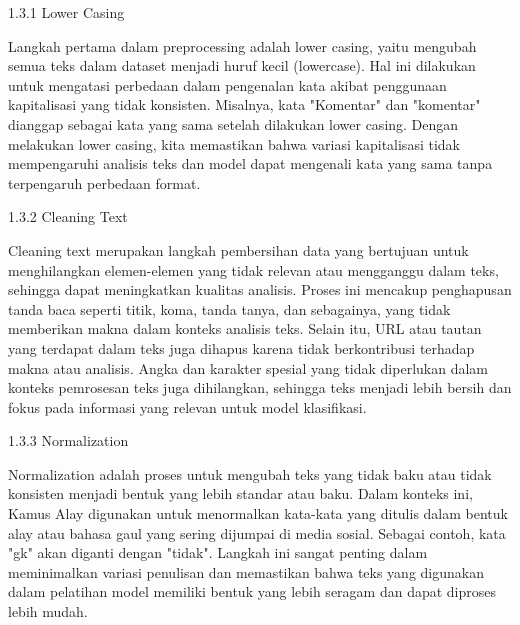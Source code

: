 \documentclass[journal,article,submit,pdftex,moreauthors]{Definitions/mdpi}
\begin{document}
\item \hspace{1cm}1.3.1 Lower Casing


\begin{adjustwidth}{2em}{0pt} \hspace{1cm}Langkah pertama dalam preprocessing adalah lower casing, yaitu mengubah semua teks dalam dataset menjadi huruf kecil (lowercase). Hal ini dilakukan untuk mengatasi perbedaan dalam pengenalan kata akibat penggunaan kapitalisasi yang tidak konsisten. Misalnya, kata "Komentar" dan "komentar" dianggap sebagai kata yang sama setelah dilakukan lower casing. Dengan melakukan lower casing, kita memastikan bahwa variasi kapitalisasi tidak mempengaruhi analisis teks dan model dapat mengenali kata yang sama tanpa terpengaruh perbedaan format.\end{adjustwidth}

\item \hspace{1cm}	1.3.2 Cleaning Text

\begin{adjustwidth}{2em}{0pt} \hspace{1cm}Cleaning text merupakan langkah pembersihan data yang bertujuan untuk menghilangkan elemen-elemen yang tidak relevan atau mengganggu dalam teks, sehingga dapat meningkatkan kualitas analisis. Proses ini mencakup penghapusan tanda baca seperti titik, koma, tanda tanya, dan sebagainya, yang tidak memberikan makna dalam konteks analisis teks. Selain itu, URL atau tautan yang terdapat dalam teks juga dihapus karena tidak berkontribusi terhadap makna atau analisis. Angka dan karakter spesial yang tidak diperlukan dalam konteks pemrosesan teks juga dihilangkan, sehingga teks menjadi lebih bersih dan fokus pada informasi yang relevan untuk model klasifikasi.\end{adjustwidth}

\item \hspace{1cm} 1.3.3 Normalization

\begin{adjustwidth}{2em}{0pt} \hspace{1cm}Normalization adalah proses untuk mengubah teks yang tidak baku atau tidak konsisten menjadi bentuk yang lebih standar atau baku. Dalam konteks ini, Kamus Alay digunakan untuk menormalkan kata-kata yang ditulis dalam bentuk alay atau bahasa gaul yang sering dijumpai di media sosial. Sebagai contoh, kata "gk" akan diganti dengan "tidak". Langkah ini sangat penting dalam meminimalkan variasi penulisan dan memastikan bahwa teks yang digunakan dalam pelatihan model memiliki bentuk yang lebih seragam dan dapat diproses lebih mudah.\end{adjustwidth}
\end{document}
